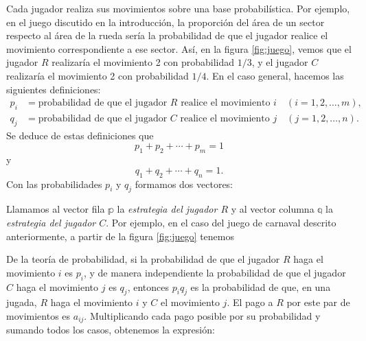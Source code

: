 Cada jugador realiza sus movimientos sobre una base probabilística. Por ejemplo, en el juego discutido en la introducción, la proporción del área de un sector respecto al área de la rueda sería la probabilidad de que el jugador realice el movimiento correspondiente a ese sector. Así, en la figura \ref{fig:juego}, vemos que el jugador $R$ realizaría el movimiento 2 con probabilidad $1/3$, y el jugador $C$ realizaría el movimiento 2 con probabilidad $1/4$. En el caso general, hacemos las siguientes definiciones:
\begin{align*}
    p_i & = \text{probabilidad de que el jugador } R \text{ realice el movimiento } i \quad (i = 1, 2, \dots, m), \\
    q_j & = \text{probabilidad de que el jugador } C \text{ realice el movimiento } j \quad (j = 1, 2, \dots, n).
\end{align*}
Se deduce de estas definiciones que
$$p_1 + p_2 + \cdots + p_m = 1$$
y
$$q_1 + q_2 + \cdots + q_n = 1.$$\newpage\noindent
Con las probabilidades $p_i$ y $q_j$ formamos dos vectores:
\begin{matrizn}
\end{matrizn}
Llamamos al vector fila $\mathbb{p}$ la \emph{estrategia del jugador $R$} y al vector columna $\mathbb{q}$ la \emph{estrategia del jugador $C$}. Por ejemplo, en el caso del juego de carnaval descrito anteriormente, a partir de la figura \ref{fig:juego} tenemos
\begin{matrizn}
\end{matrizn}
De la teoría de probabilidad, si la probabilidad de que el jugador $R$ haga el movimiento $i$ es $p_i$, y de manera independiente la probabilidad de que el jugador $C$ haga el movimiento $j$ es $q_j$, entonces $p_iq_j$ es la probabilidad de que, en una jugada, $R$ haga el movimiento $i$ y $C$ el movimiento $j$. El pago a $R$ por este par de movimientos es $a_{ij}$. Multiplicando cada pago posible por su probabilidad y sumando todos los casos, obtenemos la expresión:

